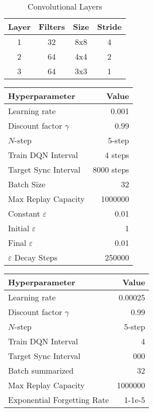 {{\begin{table}[H]
    \caption{Convolutional Layers}
    \label{tb:conv_net}
    \centering
    \begin{tabular}{@{}cccc@{}}
        \toprule
        Layer & Filters & Size & Stride \\ \midrule
        1 & 32 & 8x8 & 4 \\
        2 & 64 & 4x4 & 2 \\
        3 & 64 & 3x3 & 1 \\ \bottomrule
    \end{tabular}
\end{table}

\begin{table}[H]
    \centering
    \begin{tabular}{@{}lr@{}}
        \toprule
        Hyperparameter               & Value \\ \midrule
        Learning rate                & 0.001 \\
        Discount factor $\gamma$     & 0.99  \\
        $N$-step                     & 5-step \\
        Train DQN Interval           & 4 steps \\
        Target Sync Interval         & 8000 steps \\
        Batch Size                   & 32 \\
        Max Replay Capacity          & 1000000 \\ 
        Constant $\varepsilon$       & 0.01 \\ 
        Initial $\varepsilon$        & 1 \\
        Final $\varepsilon$          & 0.01 \\
        $\varepsilon$ Decay Steps    & 250000 \\ \bottomrule
    \end{tabular}
    \quad
    \begin{tabular}{@{}lr@{}}
        \toprule
        Hyperparameter               & Value \\ \midrule
        Learning rate                & 0.00025 \\
        Discount factor $\gamma$     & 0.99  \\
        $N$-step                     & 5-step \\
        Train DQN Interval           & 4 \\
        Target Sync Interval         & 000 \\
        Batch summarized             & 32 \\
        Max Replay Capacity          & 1000000 \\
        Exponential Forgetting Rate  & 1-1e-5 \\ \bottomrule
    \end{tabular}
\end{table}

}}
